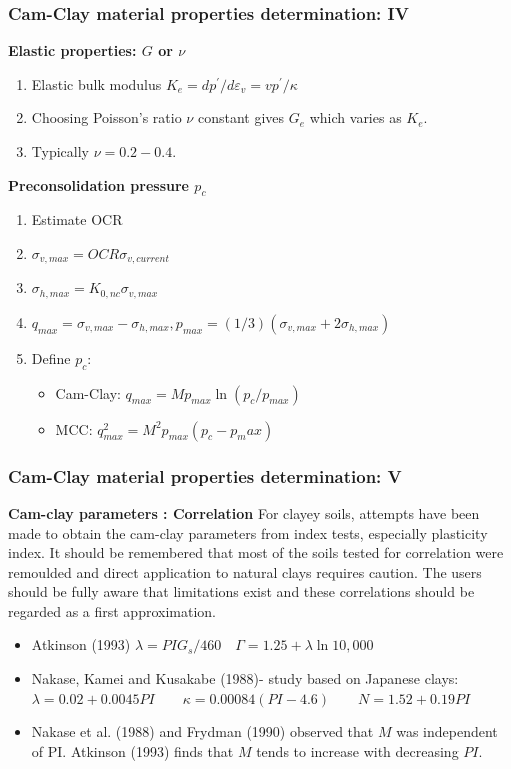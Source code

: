 \documentclass[notes]{beamer}
\begin{document}
\begin{frame}
\frametitle{Cam-Clay material properties determination: IV}
\textbf{Elastic properties: $G$ or $\nu$}
\begin{enumerate}
	\item Elastic bulk modulus $K_e = dp^\prime / d\varepsilon_v = vp^\prime / \kappa$
	\item Choosing Poisson's ratio $\nu$ constant gives $G_e$ which varies as $K_e$.
	\item Typically $\nu= 0.2 - 0.4$.
\end{enumerate}
\textbf{Preconsolidation pressure $p_c$}
\begin{enumerate}
	\item Estimate OCR
	\item $\sigma_{v, max} = OCR \sigma_{v, current}$
	\item $\sigma_{h, max} = K_{0, nc}\sigma_{v, max}$
	\item $q_{max} = \sigma_{v, max} - \sigma_{h, max}, p_{max} = (1/3) (\sigma_{v, max} + 2 \sigma_{h, max})$
	\item Define $p_c$:
	\begin{itemize}
		\item Cam-Clay: $q_{max} = M p_{max} \ln (p_c/ p_{max})$
		\item MCC: $q_{max}^2 = M^2 p_{max} (p_c - p_max)$
	\end{itemize}
\end{enumerate}
\end{frame}

\begin{frame}
\frametitle{Cam-Clay material properties determination: V}
\textbf{Cam-clay parameters : Correlation}
For clayey soils, attempts have been made to obtain the cam-clay parameters from
index tests, especially plasticity index. It should be remembered that most of the
soils tested for correlation were remoulded and direct application to natural clays
requires caution. The users should be fully aware that limitations exist and these
correlations should be regarded as a first approximation.
\begin{itemize}
	\item Atkinson (1993) $\lambda = PI G_s / 460 \quad \Gamma = 1.25 + \lambda \ln 10,000$
	\item Nakase, Kamei and Kusakabe (1988)- study based on Japanese clays: $\lambda = 0.02 + 0.0045 PI \qquad \kappa = 0.00084 (PI - 4.6) \qquad N = 1.52 + 0.19 PI$
	\item Nakase et al. (1988) and Frydman (1990) observed that $M$ was independent of PI.
	Atkinson (1993) finds that $M$ tends to increase with decreasing $PI$. 
	
\end{itemize}
\end{frame}
\end{document}
